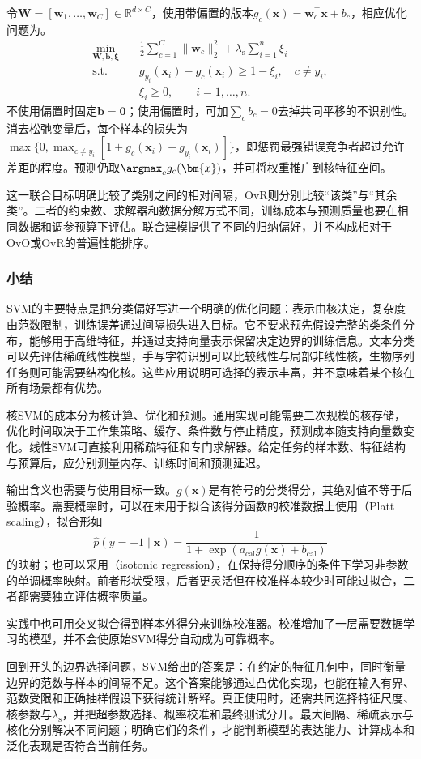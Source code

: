 令$\bm{W}=[\bm{w}_1,\ldots,\bm{w}_C]\in\mathbb{R}^{d\times C}$，使用带偏置的版本$g_c(\bm{x})=\bm{w}_c^{\top}\bm{x}+b_c$，相应优化问题为。
\begin{equation}
  \begin{aligned}
    \min_{\bm{W},\bm{b},\bm{\xi}}\quad&
      \frac12\sum_{c=1}^C\lVert\bm{w}_c\rVert_2^2
       +\lambda_{\mathrm{s}}\sum_{i=1}^n\xi_i\\
    \text{s.t.}\quad&
      g_{y_i}(\bm{x}_i)-g_c(\bm{x}_i)\ge1-\xi_i,
      \quad c\ne y_i,\\
    &\xi_i\ge0,\qquad i=1,\ldots,n.
  \end{aligned}
  \label{eq:classification-svm-crammer-singer}
\end{equation}
不使用偏置时固定$\bm{b}=\bm{0}$；使用偏置时，可加$\sum_c b_c=0$去掉共同平移的不识别性。消去松弛变量后，每个样本的损失为$\max\{0,\max_{c\ne y_i}[1+g_c(\bm{x}_i)-g_{y_i}(\bm{x}_i)]\}$，即惩罚最强错误竞争者超过允许差距的程度。预测仍取$\argmax_c g_c(\bm{x})$，并可将权重推广到核特征空间。

这一联合目标明确比较了类别之间的相对间隔，OvR则分别比较“该类”与“其余类”。二者的约束数、求解器和数据分解方式不同，训练成本与预测质量也要在相同数据和调参预算下评估。联合建模提供了不同的归纳偏好，并不构成相对于OvO或OvR的普遍性能排序。

\subsubsection{小结}
\label{sec:classification-svm-summary}
\label{sec:classification-svm-assessment}

SVM的主要特点是把分类偏好写进一个明确的优化问题：表示由核决定，复杂度由范数限制，训练误差通过间隔损失进入目标。它不要求预先假设完整的类条件分布，能够用于高维特征，并通过支持向量表示保留决定边界的训练信息。文本分类可以先评估稀疏线性模型，手写字符识别可以比较线性与局部非线性核，生物序列任务则可能需要结构化核。这些应用说明可选择的表示丰富，并不意味着某个核在所有场景都有优势。

核SVM的成本分为核计算、优化和预测。通用实现可能需要二次规模的核存储，优化时间取决于工作集策略、缓存、条件数与停止精度，预测成本随支持向量数变化。线性SVM可直接利用稀疏特征和专门求解器。给定任务的样本数、特征结构与预算后，应分别测量内存、训练时间和预测延迟。

输出含义也需要与使用目标一致。$g(\bm{x})$是有符号的分类得分，其绝对值不等于后验概率。需要概率时，可以在未用于拟合该得分函数的校准数据上使用（Platt scaling），拟合形如
\[
  \widehat p(y=+1\mid\bm{x})
  =\frac1{1+\exp(a_{\mathrm{cal}}g(\bm{x})+b_{\mathrm{cal}})}
\]
的映射；也可以采用（isotonic regression），在保持得分顺序的条件下学习非参数的单调概率映射。前者形状受限，后者更灵活但在校准样本较少时可能过拟合，二者都需要独立评估概率质量。

实践中也可用交叉拟合得到样本外得分来训练校准器。校准增加了一层需要数据学习的模型，并不会使原始SVM得分自动成为可靠概率。

回到开头的边界选择问题，SVM给出的答案是：在约定的特征几何中，同时衡量边界的范数与样本的间隔不足。这个答案能够通过凸优化实现，也能在输入有界、范数受限和正确抽样假设下获得统计解释。真正使用时，还需共同选择特征尺度、核参数与$\lambda_{\mathrm{s}}$，并把超参数选择、概率校准和最终测试分开。最大间隔、稀疏表示与核化分别解决不同问题；明确它们的条件，才能判断模型的表达能力、计算成本和泛化表现是否符合当前任务。
